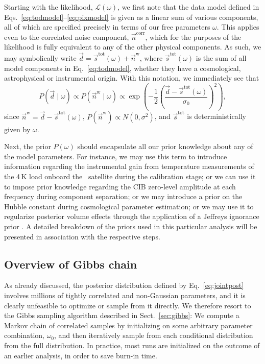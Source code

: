\documentclass[twocolumn]{aa}
\renewcommand{\d}[0]{\vec{d}}
\newcommand{\n}[0]{\vec{n}}
\newcommand{\s}[0]{\vec{s}}
\begin{document}
Starting with the likelihood, $\mathcal{L}(\omega)$, we first note
that the data model defined in
Eqs.~\eqref{eq:todmodel}--\eqref{eq:pixmodel} is given as a linear sum of
various components, all of which are specified precisely in terms of
our free parameters $\omega$. This applies even to the correlated
noise component, $\n^{\mathrm{corr}}$, which for the purposes of the
likelihood is fully equivalent to any of the other physical
components. As such, we may symbolically write $\d =
\s^{\mathrm{tot}}(\omega) + \n^{\mathrm{w}}$, where
$\s^{\mathrm{tot}}(\omega)$ is the sum of all model components in
Eq.~\eqref{eq:todmodel}, whether they have a cosmological, astrophysical
or instrumental origin. With this notation, we immediately see that
\begin{equation}
P(\d\mid \omega) \propto P(\n^{\mathrm{w}}\mid \omega) \propto \exp\left({-\frac{1}{2}\left(\frac{\d-\s^{\mathrm{tot}}(\omega)}{\sigma_0}\right)^2}\right),
\end{equation}
since $\n^{\mathrm{w}} = \d - \s^{\mathrm{tot}}(\omega)$, 
$P(\n^{\mathrm{w}}) \propto N(0,\sigma^2)$, and $\s^{\mathrm{tot}}$ is
deterministically given by $\omega$.

Next, the prior $P(\omega)$ should encapsulate all our prior knowledge
about any of the model parameters. For instance, we may use this term
to introduce information regarding the instrumental gain from
temperature measurements of the 4\,K load onboard the
\Planck\ satellite during the calibration stage; or we can use it to
impose prior knowledge regarding the CIB zero-level amplitude at each
frequency during component separation; or we may introduce a prior on
the Hubble constant during cosmological parameter estimation; or we
may use it to regularize posterior volume effects through the
application of a Jeffreys ignorance prior \citep{jeffreys:1946}. A
detailed breakdown of the priors used in this particular analysis will
be presented in association with the respective steps.

\subsection{Overview of Gibbs chain}
\label{sec:gibbschain}

As already discussed, the posterior distribution defined by
Eq.~\ref{eq:jointpost} involves millions of tightly correlated and
non-Gaussian parameters, and it is clearly unfeasible to optimize or
sample from it directly. We therefore resort to the Gibbs sampling
algorithm described in Sect.~\ref{sec:gibbs}: We compute a Markov
chain of correlated samples by initializing on some arbitrary
parameter combination, $\omega_0$, and then iteratively sample from
each conditional distribution from the full distribution. In
practice, most runs are initialized on the outcome of an earlier
analysis, in order to save burn-in time.
\end{document}
